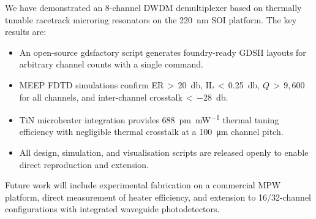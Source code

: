 We have demonstrated an 8-channel DWDM demultiplexer based on thermally
tunable racetrack microring resonators on the \SI{220}{\nano\meter} SOI
platform.  The key results are:
\begin{itemize}
  \item An open-source gdsfactory script generates foundry-ready GDSII
        layouts for arbitrary channel counts with a single command.
  \item MEEP FDTD simulations confirm ER\,$>\,$\SI{20}{\decibel},
        IL\,$<$\,\SI{0.25}{\decibel}, $Q\,>\,9{,}600$ for all channels, and
        inter-channel crosstalk\,$<$\,\SI{-28}{\decibel}.
  \item TiN microheater integration provides \SI{688}{\pico\meter\per\milli\watt}
        thermal tuning efficiency with negligible thermal crosstalk at a
        \SI{100}{\micro\meter} channel pitch.
  \item All design, simulation, and visualisation scripts are released
        openly to enable direct reproduction and extension.
\end{itemize}

Future work will include experimental fabrication on a commercial MPW
platform, direct measurement of heater efficiency, and extension to
16/32-channel configurations with integrated waveguide photodetectors.
